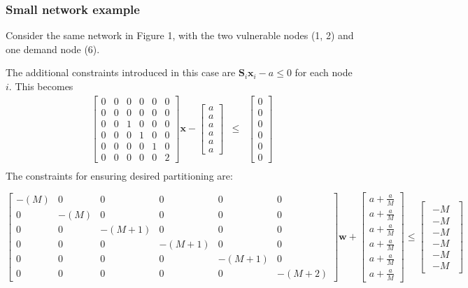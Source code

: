 \documentclass[authoryear,preprint,review,12pt]{elsarticle}
\begin{document}
\subsubsection{Small network example}

Consider the same network in Figure 1, with the two vulnerable nodes
(1, 2) and one demand node (6).

The additional constraints introduced in this case are $\mathbf{S}_{i}\mathbf{x}_{i}-a\leq0$
for each node $i$. This becomes
\begin{eqnarray*}
\left[\begin{array}{cccccc}
0 & 0 & 0 & 0 & 0 & 0\\
0 & 0 & 0 & 0 & 0 & 0\\
0 & 0 & 1 & 0 & 0 & 0\\
0 & 0 & 0 & 1 & 0 & 0\\
0 & 0 & 0 & 0 & 1 & 0\\
0 & 0 & 0 & 0 & 0 & 2
\end{array}\right]\mathbf{x}-\left[\begin{array}{c}
a\\
a\\
a\\
a\\
a\\
a
\end{array}\right] & \leq & \left[\begin{array}{c}
0\\
0\\
0\\
0\\
0\\
0
\end{array}\right]\\
\end{eqnarray*}
 The constraints for ensuring desired partitioning are:


\[
\left[\begin{array}{cccccc}
-(M) & 0 & 0 & 0 & 0 & 0\\
0 & -(M) & 0 & 0 & 0 & 0\\
0 & 0 & -(M+1) & 0 & 0 & 0\\
0 & 0 & 0 & -(M+1) & 0 & 0\\
0 & 0 & 0 & 0 & -(M+1) & 0\\
0 & 0 & 0 & 0 & 0 & -(M+2)
\end{array}\right]\mathbf{w}+\left[\begin{array}{c}
a+\frac{a}{M}\\
a+\frac{a}{M}\\
a+\frac{a}{M}\\
a+\frac{a}{M}\\
a+\frac{a}{M}\\
a+\frac{a}{M}
\end{array}\right]\leq\left[\begin{array}{c}
\begin{array}{c}
-M\\
-M\\
-M\\
-M\\
-M\\
-M
\end{array}\end{array}\right]
\]
\end{document}
